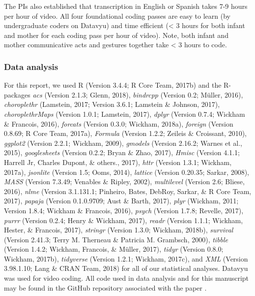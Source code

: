 \documentclass[english,man]{apa6}
\theoremstyle{definition}
\theoremstyle{definition}
\theoremstyle{definition}
\theoremstyle{remark}
\begin{document}
The PIs also established that transcription in English or Spanish takes
7-9 hours per hour of video. All four foundational coding passes are
easy to learn (by undergraduate coders on Datavyu) and time efficient
(\textless{} 3 hours for both infant and mother for each coding pass per
hour of video). Note, both infant and mother communicative acts and
gestures together take \textless{} 3 hours to code.

\subsubsection{Data analysis}\label{data-analysis}

For this report, we used R (Version 3.4.4; R Core Team, 2017b) and the
R-packages \emph{acs} (Version 2.1.3; Glenn, 2018), \emph{bindrcpp}
(Version 0.2; Müller, 2016), \emph{choroplethr} (Lamstein, 2017; Version
3.6.1; Lamstein \& Johnson, 2017), \emph{choroplethrMaps} (Version
1.0.1; Lamstein, 2017), \emph{dplyr} (Version 0.7.4; Wickham \&
Francois, 2016), \emph{forcats} (Version 0.3.0; Wickham, 2018a),
\emph{foreign} (Version 0.8.69; R Core Team, 2017a), \emph{Formula}
(Version 1.2.2; Zeileis \& Croissant, 2010), \emph{ggplot2} (Version
2.2.1; Wickham, 2009), \emph{gmodels} (Version 2.16.2; Warnes et al.,
2015), \emph{googlesheets} (Version 0.2.2; Bryan \& Zhao, 2017),
\emph{Hmisc} (Version 4.1.1; Harrell Jr, Charles Dupont, \& others.,
2017), \emph{httr} (Version 1.3.1; Wickham, 2017a), \emph{jsonlite}
(Version 1.5; Ooms, 2014), \emph{lattice} (Version 0.20.35; Sarkar,
2008), \emph{MASS} (Version 7.3.49; Venables \& Ripley, 2002),
\emph{multilevel} (Version 2.6; Bliese, 2016), \emph{nlme} (Version
3.1.131.1; Pinheiro, Bates, DebRoy, Sarkar, \& R Core Team, 2017),
\emph{papaja} (Version 0.1.0.9709; Aust \& Barth, 2017), \emph{plyr}
(Wickham, 2011; Version 1.8.4; Wickham \& Francois, 2016), \emph{psych}
(Version 1.7.8; Revelle, 2017), \emph{purrr} (Version 0.2.4; Henry \&
Wickham, 2017), \emph{readr} (Version 1.1.1; Wickham, Hester, \&
Francois, 2017), \emph{stringr} (Version 1.3.0; Wickham, 2018b),
\emph{survival} (Version 2.41.3; Terry M. Therneau \& Patricia M.
Grambsch, 2000), \emph{tibble} (Version 1.4.2; Wickham, Francois, \&
Müller, 2017), \emph{tidyr} (Version 0.8.0; Wickham, 2017b),
\emph{tidyverse} (Version 1.2.1; Wickham, 2017c), and \emph{XML}
(Version 3.98.1.10; Lang \& CRAN Team, 2018) for all of our statistical
analyses. Datavyu \cite{datavyu} was used for video coding. All code
used in data analysis and for this manuscript may be found in the GitHub
repository associated with the paper \cite{github.paper}.
\end{document}
